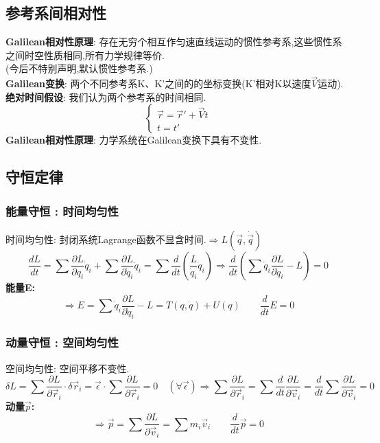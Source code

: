 \documentclass{article}
\begin{document}
\subsection{参考系间相对性}
\textbf{Galilean相对性原理}: 存在无穷个相互作匀速直线运动的惯性参考系,这些惯性系之间时空性质相同,所有力学规律等价.\\
(今后不特别声明,默认惯性参考系.)\\
\textbf{Galilean变换}: 两个不同参考系K、K'之间的的坐标变换(K'相对K以速度$\vec V$运动).\\
\textbf{绝对时间假设}: 我们认为两个参考系的时间相同.
\begin{displaymath}
    \left\{ \begin{array}{ll}
    \vec r = \vec r' + \vec V t\\
    t = t'
    \end{array} \right.
\end{displaymath}
\textbf{Galilean相对性原理}: 力学系统在Galilean变换下具有不变性.


\subsection{守恒定律}
\subsubsection{能量守恒 : 时间均匀性}
时间均匀性: 封闭系统Lagrange函数不显含时间.\quad $\Rightarrow L(\vec q,\dot \vec q)$\\
\[\frac{dL}{dt}
 = \sum \frac{\partial L}{\partial q_i} \dot q_i + \sum \frac{\partial L}{\partial \dot q_i} \ddot q_i
 = \sum \frac{d}{dt}(\frac{L}{\dot q_i}\dot q_i)
\Rightarrow \frac{d}{dt}(\sum \dot q_i \frac{\partial L}{\partial \dot q_i} - L) = 0\]
\textbf{能量E: }
\[\Rightarrow E = \sum \dot q_i \frac{\partial L}{\partial \dot q_i} - L
 = T(q,\dot q) + U(q)   \qquad \frac{d}{dt} E = 0\]


\subsubsection{动量守恒 : 空间均匀性}
空间均匀性: 空间平移不变性.\\
\[\delta L = \sum \frac{\partial L}{\partial \vec r_i}\cdot \delta \vec r_i
 = \vec \epsilon \cdot \sum \frac{\partial L}{\partial \vec r_i} = 0\quad(\forall \vec \epsilon)
\Rightarrow \sum \frac{\partial L}{\partial \vec r_i}
 = \sum \frac{d}{dt} \frac{\partial L}{\partial \vec v_i}
 = \frac{d}{dt} \sum \frac{\partial L}{\partial \vec v_i} = 0\]
\textbf{动量$\vec p$: }
\[\Rightarrow \vec p = \sum \frac{\partial L}{\partial \vec v_i} = \sum m_i \vec v_i  \qquad \frac{d}{dt}\vec p = 0\]
\end{document}

